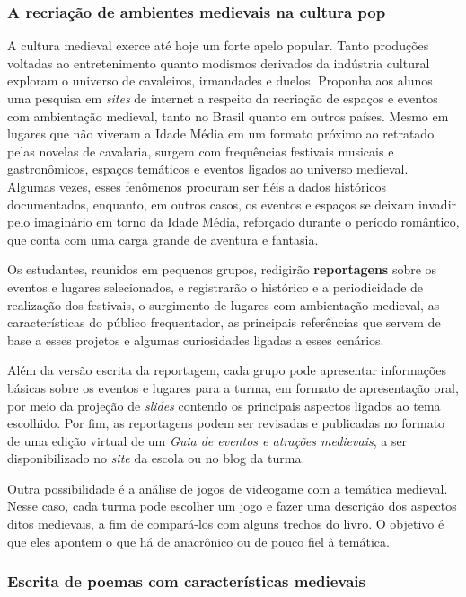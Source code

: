 \documentclass[11pt]{extarticle}
\begin{document}
\subsubsection{A recriação de ambientes medievais na cultura pop}


  A cultura medieval exerce até hoje um forte apelo popular. Tanto
  produções voltadas ao entretenimento quanto modismos derivados da
  indústria cultural exploram o universo de cavaleiros, irmandades e
  duelos. Proponha aos alunos uma pesquisa em \emph{sites} de internet a
  respeito da recriação de espaços e eventos com ambientação medieval,
  tanto no Brasil quanto em outros países. Mesmo em lugares que não
  viveram a Idade Média em um formato próximo ao retratado pelas novelas
  de cavalaria, surgem com frequências festivais musicais e
  gastronômicos, espaços temáticos e eventos ligados ao universo
  medieval. Algumas vezes, esses fenômenos procuram ser fiéis a dados
  históricos documentados, enquanto, em outros casos, os eventos e
  espaços se deixam invadir pelo imaginário em torno da Idade Média,
  reforçado durante o período romântico, que conta com uma carga grande
  de aventura e fantasia. 

  Os estudantes, reunidos em pequenos grupos,
  redigirão \textbf{reportagens} sobre os eventos e lugares
  selecionados, e registrarão o histórico e a periodicidade de
  realização dos festivais, o surgimento de lugares com ambientação
  medieval, as características do público frequentador, as principais
  referências que servem de base a esses projetos e algumas curiosidades
  ligadas a esses cenários. 

  Além da versão escrita da reportagem, cada
  grupo pode apresentar informações básicas sobre os eventos e lugares
  para a turma, em formato de apresentação oral, por meio da projeção de
  \emph{slides} contendo os principais aspectos ligados ao tema
  escolhido. Por fim, as reportagens podem ser revisadas e publicadas no
  formato de uma edição virtual de um \emph{Guia de eventos e atrações
  medievais}, a ser disponibilizado no \emph{site} da escola ou no blog
  da turma.

  Outra possibilidade é a análise de jogos de videogame com a temática 
  medieval. Nesse caso, cada turma pode escolher um jogo e fazer uma descrição 
  dos aspectos ditos medievais, a fim de compará-los com alguns trechos do livro. 
  O objetivo é que eles apontem o que há de anacrônico ou de pouco fiel à 
  temática.  

\subsubsection{Escrita de poemas com características medievais}
\end{document}

